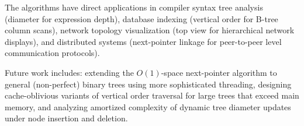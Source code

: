 \documentclass[10pt,journal,compsoc,onecolumn]{IEEEtran}
\begin{document}
The algorithms have direct applications in compiler syntax tree analysis (diameter for expression depth), database indexing (vertical order for B-tree column scans), network topology visualization (top view for hierarchical network displays), and distributed systems (next-pointer linkage for peer-to-peer level communication protocols).

Future work includes: extending the $O(1)$-space next-pointer algorithm to general (non-perfect) binary trees using more sophisticated threading, designing cache-oblivious variants of vertical order traversal for large trees that exceed main memory, and analyzing amortized complexity of dynamic tree diameter updates under node insertion and deletion.
\end{document}
